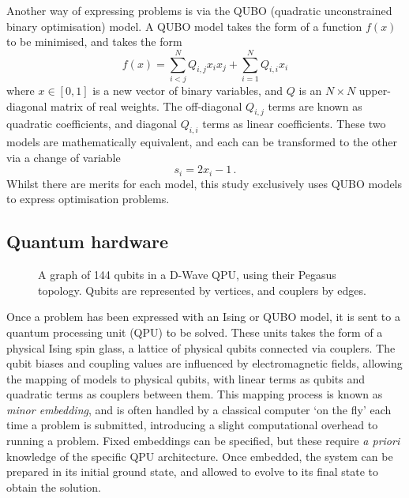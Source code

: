 \documentclass[12pt]{article}
\theoremstyle{definition}
\begin{document}
Another way of expressing problems is via the QUBO (quadratic unconstrained binary optimisation) model. A QUBO model takes the form of a function $f(x)$ to be minimised, and takes the form
\begin{equation}
    f(x)=\sum^N_{i<j}Q_{i,j}x_ix_j + \sum^N_{i=1}Q_{i,i}x_i
    \label{eq:qubo}
\end{equation}
where $x\in[0,1]$ is a new vector of binary variables, and $Q$ is an $N\times N$ upper-diagonal matrix of real weights. The off-diagonal $Q_{i,j}$ terms are known as quadratic coefficients, and diagonal $Q_{i,i}$ terms as linear coefficients. These two models are mathematically equivalent, and each can be transformed to the other via a change of variable
\begin{equation}
    s_i = 2x_i - 1 \,.
    \label{eq:qubo-ising}
\end{equation}
Whilst there are merits for each model, this study exclusively uses QUBO models to express optimisation problems.

\subsection{Quantum hardware}

\begin{figure}[h]
    \centering
    
    \caption[A graph of \num{144} qubits in a D-Wave QPU.]{A graph of \num{144} qubits in a D-Wave QPU, using their Pegasus topology. Qubits are represented by vertices, and couplers by edges.}
    \label{fig:pegasus}
\end{figure}

Once a problem has been expressed with an Ising or QUBO model, it is sent to a quantum processing unit (QPU) to be solved. These units takes the form of a physical Ising spin glass, a lattice of physical qubits connected via couplers. The qubit biases and coupling values are influenced by electromagnetic fields, allowing the mapping of models to physical qubits, with linear terms as qubits and quadratic terms as couplers between them. This mapping process is known as \emph{minor embedding}, and is often handled by a classical computer `on the fly' each time a problem is submitted, introducing a slight computational overhead to running a problem. Fixed embeddings can be specified, but these require \textit{a priori} knowledge of the specific QPU architecture. Once embedded, the system can be prepared in its initial ground state, and allowed to evolve to its final state to obtain the solution.
\end{document}
